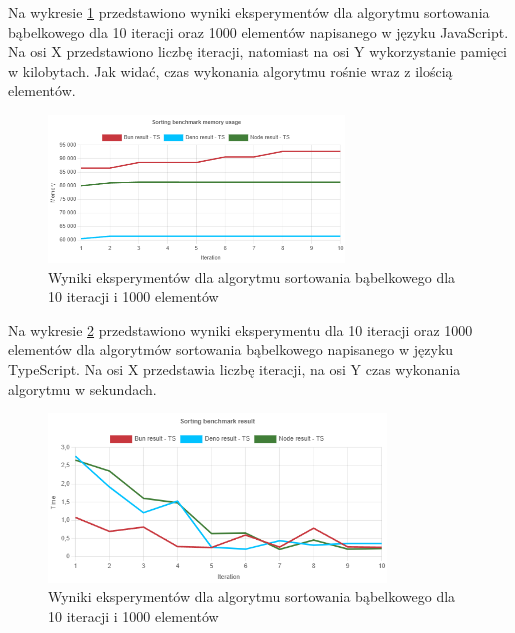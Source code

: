 Na wykresie \ref{fig:quick_sorting_e1_memory_js} przedstawiono wyniki eksperymentów dla algorytmu sortowania bąbelkowego dla 10 iteracji oraz 1000 elementów napisanego w języku JavaScript. Na osi X przedstawiono liczbę iteracji, natomiast na osi Y wykorzystanie pamięci w kilobytach. Jak widać, czas wykonania algorytmu rośnie wraz z ilością elementów.
\begin{figure}[H]
  \centering
  \includegraphics[width=0.7\textwidth]{Figures/sorting/quick/e1_memory_ts.png}
  \caption{Wyniki eksperymentów dla algorytmu sortowania bąbelkowego dla 10 iteracji i 1000 elementów}
  \label{fig:quick_sorting_e1_memory_js}
\end{figure}

Na wykresie \ref{fig:quick_sorting_e1_ts} przedstawiono wyniki eksperymentu dla 10 iteracji oraz 1000 elementów dla algorytmów sortowania bąbelkowego napisanego w języku TypeScript. Na osi X przedstawia liczbę iteracji, na osi Y czas wykonania algorytmu w sekundach.

\begin{figure}[H]
  \centering
  \includegraphics[width=0.8\textwidth]{Figures/sorting/quick/e1_ts.png}
  \caption{Wyniki eksperymentów dla algorytmu sortowania bąbelkowego dla 10 iteracji i 1000 elementów}
  \label{fig:quick_sorting_e1_ts}
\end{figure}

